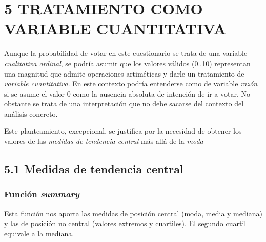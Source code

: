 \documentclass[
]{article}
\newenvironment{Shaded}{\begin{snugshade}}{\end{snugshade}}
\newcommand{\CommentTok}[1]{\textcolor[rgb]{0.56,0.35,0.01}{\textit{#1}}}
\newcommand{\FunctionTok}[1]{\textcolor[rgb]{0.13,0.29,0.53}{\textbf{#1}}}
\newcommand{\NormalTok}[1]{#1}
\newcommand{\SpecialCharTok}[1]{\textcolor[rgb]{0.81,0.36,0.00}{\textbf{#1}}}
\begin{document}
\begin{Shaded}
\end{Shaded}

\hypertarget{tratamiento-como-variable-cuantitativa}{%
\section{5 TRATAMIENTO COMO VARIABLE
CUANTITATIVA}\label{tratamiento-como-variable-cuantitativa}}

Aunque la probabilidad de votar en este cuestionario se trata de una
variable \emph{cualitativa ordinal}, se podría asumir que los valores
válidos (0..10) representan una magnitud que admite operaciones
artiméticas y darle un tratamiento de \emph{variable cuantitativa}. En
este contexto podría entenderse como de variable \emph{razón} si se
asume el valor 0 como la ausencia absoluta de intención de ir a votar.
No obstante se trata de una interpretación que no debe sacarse del
contexto del análisis concreto.

Este planteamiento, excepcional, se justifica por la necesidad de
obtener los valores de las \emph{medidas de tendencia central} más allá
de la \emph{moda}

\hypertarget{medidas-de-tendencia-central}{%
\subsection{5.1 Medidas de tendencia
central}\label{medidas-de-tendencia-central}}

\hypertarget{funciuxf3n-summary}{%
\subsubsection{\texorpdfstring{Función
\emph{summary}}{Función summary}}\label{funciuxf3n-summary}}

Esta función nos aporta las medidas de posición central (moda, media y
mediana) y las de posición no central (valores extremos y cuartiles). El
segundo cuartil equivale a la mediana.

\begin{Shaded}
\end{Shaded}
\end{document}
